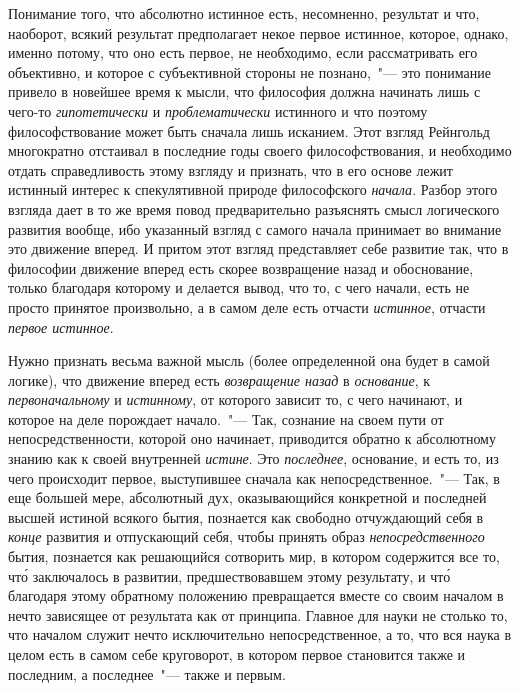 Понимание того, что абсолютно истинное есть, несомненно,
результат и что, наоборот, всякий результат
предполагает некое первое истинное, которое, однако,
именно потому, что оно есть первое, не необходимо, если
рассматривать его объективно, и которое с субъективной
стороны не познано,~"--- это понимание привело в новейшее
время к мысли, что философия должна начинать
лишь с чего-то \emph{гипотетически} и \emph{проблематически} истинного
и что поэтому философствование может быть сначала
лишь исканием. Этот взгляд Рейнгольд многократно
отстаивал в последние годы своего философствования, и
необходимо отдать справедливость этому взгляду и признать,
что в его основе лежит истинный интерес к спекулятивной
природе философского \emph{начала}. Разбор этого
взгляда дает в то же время повод предварительно разъяснять
смысл логического развития вообще, ибо указанный
взгляд с самого начала принимает во внимание это
движение вперед. И притом этот взгляд представляет
себе развитие так, что в философии движение вперед
есть скорее возвращение назад и обоснование, только благодаря
которому и делается вывод, что то, с чего начали,
есть не просто принятое произвольно, а в самом деле
есть отчасти \emph{истинное}, отчасти \emph{первое истинное}.

Нужно признать весьма важной мысль (более определенной
она будет в самой логике), что движение вперед
есть \emph{возвращение назад} в \emph{основание}, к \emph{первоначальному}
и \emph{истинному}, от которого зависит то, с чего начинают,
и которое на деле порождает начало.~"--- Так, сознание
на своем пути от непосредственности, которой оно
начинает, приводится обратно к абсолютному знанию
как к своей внутренней \emph{истине}. Это \emph{последнее}, основание,
и есть то, из чего происходит первое, выступившее
сначала как непосредственное.~"--- Так, в еще большей
мере, абсолютный дух, оказывающийся конкретной и последней
высшей истиной всякого бытия, познается как
свободно отчуждающий себя в \emph{конце} развития и отпускающий
себя, чтобы принять образ \emph{непосредственного}
бытия, познается как решающийся сотворить мир, в котором
содержится все то, чт\'о заключалось в развитии,
предшествовавшем этому результату, и чт\'о благодаря
этому обратному положению превращается вместе со
своим началом в нечто зависящее от результата как от
принципа. Главное для науки не столько то, что началом
служит нечто исключительно непосредственное, а то, что
вся наука в целом есть в самом себе круговорот, в котором
первое становится также и последним, а последнее~"---
также и первым.

